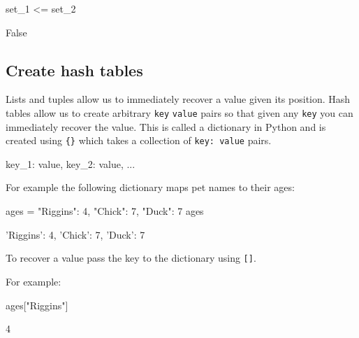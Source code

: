 \begin{pyin}
set_1 <= set_2
\end{pyin}





\begin{raw}
False
\end{raw}





\subsection{Create hash tables}
\label{sec:create_hash_tables}

Lists and tuples allow us to immediately recover a value given its position.
Hash tables allow us to create arbitrary \texttt{key} \texttt{value} pairs so that given any
\texttt{key} you can immediately recover the value. This is called a dictionary in
Python and is created using \texttt{\{\}} which takes a collection of \texttt{key: value}
pairs.


\begin{api}
{key_1: value, key_2: value, ...}
\end{api}



For example the following dictionary maps pet names to their ages:




\begin{pyin}
ages = {"Riggins": 4, "Chick": 7, "Duck": 7}
ages
\end{pyin}





\begin{raw}
{'Riggins': 4, 'Chick': 7, 'Duck': 7}
\end{raw}





To recover a value pass the key to the dictionary using \texttt{{[}{]}}.


For example:




\begin{pyin}
ages["Riggins"]
\end{pyin}





\begin{raw}
4
\end{raw}






